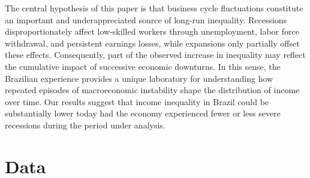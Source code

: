 \documentclass[12pt]{article}
\newcommand{\citeonline}[1]{\citet{#1}}
\begin{document}
	The central hypothesis of this paper is that business cycle fluctuations constitute an important and underappreciated source of long-run inequality. Recessions disproportionately affect low-skilled workers through unemployment, labor force withdrawal, and persistent earnings losses, while expansions only partially offset these effects. Consequently, part of the observed increase in inequality may reflect the cumulative impact of successive economic downturns. In this sense, the Brazilian experience provides a unique laboratory for understanding how repeated episodes of macroeconomic instability shape the distribution of income over time. Our results suggest that income inequality in Brazil could be substantially lower today had the economy experienced fewer or less severe recessions during the period under analysis.
	
	
	
	
	\section{Data}
	
	
	
	
	
\end{document}
